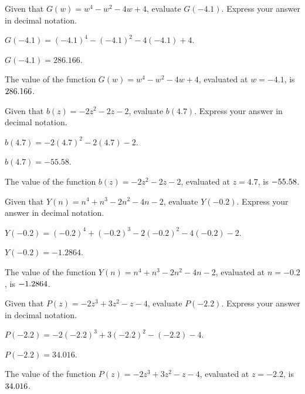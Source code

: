 \begin{shuffle}
\begin{exercise}
Given that $G(w)=w^4-w^2-4 w+4$, evaluate $G(-4.1)$. Express your answer in decimal notation.
\begin{solution}
\begin{hint}
$G(-4.1)=(-4.1)^4-(-4.1)^2-4 (-4.1)+4$.
\end{hint}
\begin{hint}
$G(-4.1)=286.166$.
\end{hint}
The value of the function $G(w)=w^4-w^2-4 w+4$, evaluated at $w=-4.1$, is ${286.166}$.
\end{solution}
\end{exercise}

\begin{exercise}
Given that $b(z)=-2 z^2-2 z-2$, evaluate $b(4.7)$. Express your answer in decimal notation.
\begin{solution}
\begin{hint}
$b(4.7)=-2 (4.7)^2-2 (4.7)-2$.
\end{hint}
\begin{hint}
$b(4.7)=-55.58$.
\end{hint}
The value of the function $b(z)=-2 z^2-2 z-2$, evaluated at $z=4.7$, is ${-55.58}$.
\end{solution}
\end{exercise}

\begin{exercise}
Given that $Y(n)=n^4+n^3-2 n^2-4 n-2$, evaluate $Y(-0.2)$. Express your answer in decimal notation.
\begin{solution}
\begin{hint}
$Y(-0.2)=(-0.2)^4+(-0.2)^3-2 (-0.2)^2-4 (-0.2)-2$.
\end{hint}
\begin{hint}
$Y(-0.2)=-1.2864$.
\end{hint}
The value of the function $Y(n)=n^4+n^3-2 n^2-4 n-2$, evaluated at $n=-0.2$, is ${-1.2864}$.
\end{solution}
\end{exercise}

\begin{exercise}
Given that $P(z)=-2 z^3+3 z^2-z-4$, evaluate $P(-2.2)$. Express your answer in decimal notation.
\begin{solution}
\begin{hint}
$P(-2.2)=-2 (-2.2)^3+3 (-2.2)^2-(-2.2)-4$.
\end{hint}
\begin{hint}
$P(-2.2)=34.016$.
\end{hint}
The value of the function $P(z)=-2 z^3+3 z^2-z-4$, evaluated at $z=-2.2$, is ${34.016}$.
\end{solution}
\end{exercise}


\end{shuffle}
